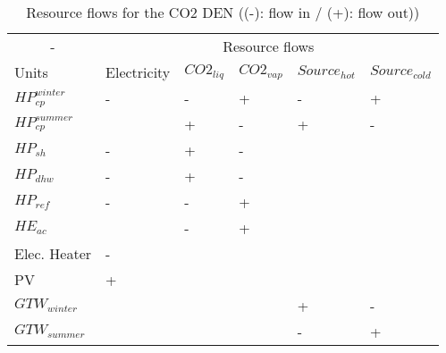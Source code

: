 \begin{table}[h!]
	\centering
	\caption{Resource flows for the CO2 DEN ((-): flow in / (+): flow out))}\vspace{2mm}
	\label{tab:layers_CO2} 
	\begin{tabular}{llllll}
		\multicolumn{1}{c}{-} & \multicolumn{5}{c}{Resource flows}                                          \\
		Units                 & Electricity & $CO2_{liq}$ & $CO2_{vap}$ & $Source_{hot}$ & $Source_{cold}$ \\
		$HP_{cp}^{winter}$    & -           & -           & +           & -              & +               \\
		$HP_{cp}^{summer}$    &             & +           & -           & +              & -               \\
		$HP_{sh}$             & -           & +           & -           &                &                 \\
		$HP_{dhw}$            & -           & +           & -           &                &                 \\
		$HP_{ref}$            & -           & -           & +           &                &                 \\
		$HE_{ac}$             &             & -           & +           &                &                 \\
		Elec. Heater          & -           &             &             &                &                 \\
		PV                    & +           &             &             &                &                 \\
		$GTW_{winter}$        &             &             &             & +              & -               \\
		$GTW_{summer}$        &             &             &             & -              & +              
	\end{tabular}
\end{table}
